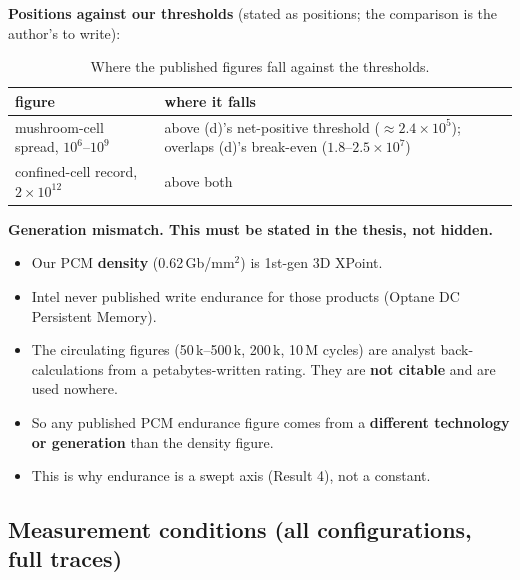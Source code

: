 \documentclass[11pt,a4paper]{article}
\newcommand{\hd}[1]{\textbf{#1}}
\begin{document}
\textbf{Positions against our thresholds} (stated as positions; the
comparison is the author's to write):

\begin{xltabular}{\linewidth}{@{}Y{0.7} Y{1.3}@{}}
\caption{Where the published figures fall against the thresholds.}\label{tab:positions}\\
\toprule
\hd{figure} & \hd{where it falls} \\
\midrule
mushroom-cell spread, $10^{6}$--$10^{9}$ & above (d)'s net-positive threshold ($\approx 2.4 \times 10^{5}$); overlaps (d)'s break-even ($1.8$--$2.5 \times 10^{7}$) \\
confined-cell record, $2 \times 10^{12}$ & above both \\
\bottomrule
\end{xltabular}

\textbf{Generation mismatch. This must be stated in the thesis, not hidden.}
\begin{itemize}
  \item Our PCM \textbf{density} (0.62\,Gb/mm$^2$) is 1st-gen 3D XPoint.
  \item Intel never published write endurance for those products (Optane DC
    Persistent Memory).
  \item The circulating figures (50\,k--500\,k, 200\,k, 10\,M cycles) are
    analyst back-calculations from a petabytes-written rating. They are
    \textbf{not citable} and are used nowhere.
  \item So any published PCM endurance figure comes from a \textbf{different
    technology or generation} than the density figure.
  \item This is why endurance is a swept axis (Result 4), not a constant.
\end{itemize}

\subsection{Measurement conditions (all configurations, full traces)}
\end{document}
